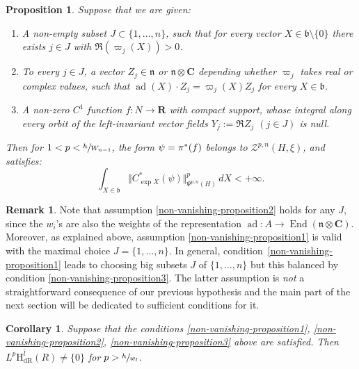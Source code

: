 \documentclass[JEP,XML,SOM,Unicode,published]{cedram}
\newcommand{\NoChangel}[1]{%
\expandafter\let\csname old\string#1\endcsname=#1
\let#1=\relax
\newcommand{#1}{\mathcode`l="716C\csname old\string#1\endcsname\mathcode`l="7160 }%
}
\newcommand{\dR}{\mathrm{dR}}
\newcommand{\rH}{\mathrm{H}}
\newcommand{\frb}{\mathfrak{b}}
\newcommand{\frn}{\mathfrak{n}}
\newcommand{\CC}{\mathbf{C}}
\newcommand{\RR}{\mathbf{R}}
\theoremstyle{plain}
\newtheorem{proposition}[equation]{Proposition}
\newtheorem{corollary}[equation]{Corollary}
\theoremstyle{remark}
\theoremstyle{definition}
\newtheorem{remark}[equation]{Remark}
\DeclareMathOperator{\ad}{ad}
\DeclareMathOperator{\End}{End}
\DeclareMathOperator{\vol}{vol}\NoChangel{\vol}
\begin{document}
\begin{proposition}
\label{non-vanishing-proposition}
Suppose that we are given:
\begin{enumerate}
\item\label{non-vanishing-proposition1} A non-empty subset $J \subset \{1, \dots , n\}$, such that for every vector $X \in \frb \setminus \{0\}$ there exists $j \in J$
with $\Re (\varpi_j (X)) >0$.
\item\label{non-vanishing-proposition2} To every $j \in J$, a vector $Z_j \in \frn$ or $\frn \otimes \CC$ depending whether $\varpi_j$ takes real or complex values,
such that $\ad(X)\cdot Z_j = \varpi_j (X) Z_j$ for every $X \in \frb$.
\item\label{non-vanishing-proposition3} A non-zero $C^1$ function $f: N \to \RR$ with compact support, whose integral along every orbit
of the left-invariant vector fields $Y_j:= \Re Z_j$ $(j \in J)$ is null.
\end{enumerate}
Then for $1<p <\sfrac{h}{W_{n-1}}$, the form $\psi = \pi^*(f\vol)$ belongs to $\mathcal Z^{p, n} (H, \xi)$,
and satisfies:
\[\int_{X \in \frb} \bigl\Vert C^*_{\exp X} (\psi) \bigr\Vert_{\Psi^{p,n}(H)}^p \,dX <+\infty.\]
\end{proposition}

\begin{remark}
\label{rk - non-vanishing condition}
Note that assumption \eqref{non-vanishing-proposition2} holds for any $J$, since the $w_i$'s are also the weights of the representation $\ad: A \to \End(\frn \otimes \CC)$.
Moreover, as explained above, assumption \eqref{non-vanishing-proposition1} is valid with the maximal choice $J = \{1, \dots, n\}$.
In general, condition~\eqref{non-vanishing-proposition1} leads to choosing big subsets $J$ of $\{1, \dots , n\}$ but this balanced by condition \eqref{non-vanishing-proposition3}.
The latter assumption is \textit{not} a straightforward consequence of our previous hypothesis and the main part of the next section will be dedicated to sufficient conditions for it.
\end{remark}

\begin{corollary}
\label{non-vanishing-corollary}
Suppose that the conditions \eqref{non-vanishing-proposition1}, \eqref{non-vanishing-proposition2}, \eqref{non-vanishing-proposition3} above are satisfied.
Then
$L^p\overline{\rH_\dR^l}(R) \neq \{0\}$ for $p >\sfrac{h}{w_l}$.
\end{corollary}
\end{document}

